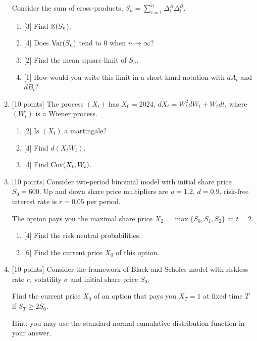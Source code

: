 \begin{enumerate}
Consider the sum of cross-products, $S_n = \sum_{i=1}^n \Delta^A_i \Delta^B_i$.
\begin{enumerate}
    \item {[3]} Find $\operatorname{\mathbb{E}}(S_n)$.
    \item {[4]} Does $\operatorname{Var}(S_n)$ tend to $0$ when $n \to \infty$?
    \item {[2]} Find the mean square limit of $S_n$. 
    \item {[1]} How would you write this limit in a short hand notation with $dA_t$ and $dB_t$?
\end{enumerate}

\item {[10 points]} The process $(X_t)$ has $X_0 = 2024$, $dX_t = W_t^2 dW_t + W_t dt$, where $(W_t)$ is a Wiener process.
\begin{enumerate}
    \item {[2]} Is $(X_t)$ a martingale?
    \item {[4]} Find $d(X_t W_t)$.
    \item {[4]} Find $\operatorname{Cov}(X_t, W_t)$.
\end{enumerate}

\item {[10 points]} Consider two-period binomial model with initial share price $S_0 = 600$. 
Up and down share price multipliers are $u=1.2$, $d=0.9$, risk-free interest rate is $r = 0.05$ per period. 

The option pays you the maximal share price $X_2 = \max\{S_0, S_1, S_2\}$ at $t=2$.

\begin{enumerate}
    \item {[4]} Find the risk neutral probabilities. 
    \item {[6]} Find the current price $X_0$ of this option. 
\end{enumerate}

\item {[10 points]}  Consider the framework of Black and Scholes model with riskless rate $r$, volatility $\sigma$ and initial share price $S_0$. 

Find the current price $X_0$ of an option that pays you $X_T = 1$ at fixed time $T$ if $S_T \geq 2 S_0$.

Hint: you may use the standard normal cumulative distribution function in your answer.


\end{enumerate}



